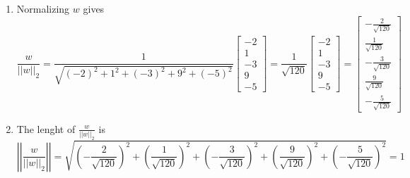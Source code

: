 \documentclass{article}
\begin{document}
\begin{enumerate}[label = (\arabic*)]
	\item Normalizing $w$ gives 
	\[
		\frac{w}{||w||_2} = \frac{1}{\sqrt{(-2)^2 + 1^2 + (-3)^2 + 9^2 + (-5)^2}}\begin{bmatrix}
		-2 \\ 1 \\ -3 \\ 9 \\ -5
		\end{bmatrix} = \frac{1}{\sqrt{120}} \begin{bmatrix}
		-2 \\ 1 \\ -3 \\ 9 \\ -5
		\end{bmatrix}
		= \begin{bmatrix}
		-\frac{2}{\sqrt{120}} \\ \frac{1}{\sqrt{120}} \\ -\frac{3}{\sqrt{120}} \\ \frac{9}{\sqrt{120}} \\ -\frac{5}{\sqrt{120}}
		\end{bmatrix}
	\]
	
	\item The lenght of $\frac{w}{||w||_2}$ is
	\[
		\left|\left|\frac{w}{||w||_2}\right|\right| = \sqrt{\left(-\frac{2}{\sqrt{120}}\right)^2+\left(\frac{1}{\sqrt{120}}\right)^2+\left(-\frac{3}{\sqrt{120}}\right)^2+\left(\frac{9}{\sqrt{120}}\right)^2+\left(-\frac{5}{\sqrt{120}}\right)^2} = 1
	\]
	
	
\end{enumerate}
\end{document}
